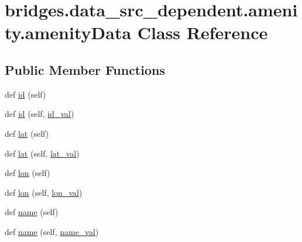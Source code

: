 \hypertarget{classbridges_1_1data__src__dependent_1_1amenity_1_1amenity_data}{}\section{bridges.\+data\+\_\+src\+\_\+dependent.\+amenity.\+amenity\+Data Class Reference}
\label{classbridges_1_1data__src__dependent_1_1amenity_1_1amenity_data}
\subsection*{Public Member Functions}
\begin{DoxyCompactItemize}
\item 
def \hyperlink{classbridges_1_1data__src__dependent_1_1amenity_1_1amenity_data_aa4317e85ae7377eaa66e975c44d6b977}{id} (self)
\item 
def \hyperlink{classbridges_1_1data__src__dependent_1_1amenity_1_1amenity_data_a63b2cdd927d08f9d939bae96bcb1de42}{id} (self, \hyperlink{classbridges_1_1data__src__dependent_1_1amenity_1_1amenity_data_a772d1e7423a3c07e3df0a24b6770a07f}{id\+\_\+val})
\item 
def \hyperlink{classbridges_1_1data__src__dependent_1_1amenity_1_1amenity_data_a44b228c50c5e138546e0e7035fe4616b}{lat} (self)
\item 
def \hyperlink{classbridges_1_1data__src__dependent_1_1amenity_1_1amenity_data_a51002cecf15ec0756de9bf03eb0497a8}{lat} (self, \hyperlink{classbridges_1_1data__src__dependent_1_1amenity_1_1amenity_data_a62c0f3cd20edddddef2652895644a6ad}{lat\+\_\+val})
\item 
def \hyperlink{classbridges_1_1data__src__dependent_1_1amenity_1_1amenity_data_a0792815050b670799823a7ed9d9c468c}{lon} (self)
\item 
def \hyperlink{classbridges_1_1data__src__dependent_1_1amenity_1_1amenity_data_a5d8c398e12c636b2fddac06a6b42e2e3}{lon} (self, \hyperlink{classbridges_1_1data__src__dependent_1_1amenity_1_1amenity_data_afea1c532aaf9a63c97db085d83e8e3d9}{lon\+\_\+val})
\item 
def \hyperlink{classbridges_1_1data__src__dependent_1_1amenity_1_1amenity_data_abef2e002d83e2fc704e884b90c46fa2d}{name} (self)
\item 
def \hyperlink{classbridges_1_1data__src__dependent_1_1amenity_1_1amenity_data_a4235a4a2824e6bd787b4ee2fef4ecaa9}{name} (self, \hyperlink{classbridges_1_1data__src__dependent_1_1amenity_1_1amenity_data_ab0a7b50037d63fcd49ccf2d19d4f0c75}{name\+\_\+val})

\end{DoxyCompactItemize}
